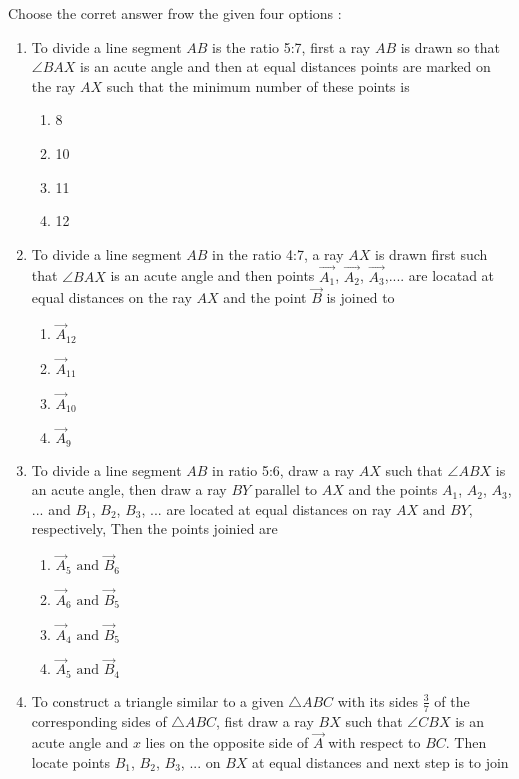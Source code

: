 Choose the corret answer frow the given four options :
\iffalse
\begin{enumerate}
\item To divide a line segment $AB$ is the ratio 5:7, first a ray $AB$ is drawn so that $\angle{BAX}$ is an acute angle and then at equal distances points are marked on the ray $AX$ such that the minimum number of these points is 
\begin{enumerate}
\item 8
\item 10
\item 11
\item 12
\end{enumerate}
\item To divide a line segment $AB$ in the ratio 4:7, a ray $AX$ is drawn first such that $\angle{BAX}$ is an acute angle and then points $\vec{A_1}$, $\vec{A_2}$, $\vec{A_3}$,.... are locatad at equal distances on the ray $AX$ and the point $\vec{B}$ is joined to 
\begin{enumerate}
	\item $\vec{A}_{12}$
	\item $\vec{A}_{11}$
	\item $\vec{A}_{10}$
	\item $\vec{A}_9$
\end{enumerate}
\item To divide a line segment $AB$ in ratio 5:6, draw a ray $AX$ such that $\angle{ABX}$ is an acute angle, then draw a ray $BY$ parallel to $AX$ and the points $A_1$, $A_2$, $A_3$, ... and $B_1$, $B_2$, $B_3$, ... are located at equal distances on ray $AX\text{ and }BY$, respectively, Then the points joinied are 
\begin{enumerate}
\item $\vec{A}_5\text{ and }\vec{B}_6$
\item $\vec{A}_6\text{ and }\vec{B}_5$
\item $\vec{A}_4\text{ and }\vec{B}_5$
\item $\vec{A}_5\text{ and }\vec{B}_4$
\end{enumerate}
\item To construct a triangle similar to a given $\triangle{ABC}$ with its sides $\frac{3}{7}$ of the corresponding sides of $\triangle{ABC}$, fist draw a ray $BX$ such that $\angle{CBX}$ is an acute angle and $x$ lies on 
the opposite side of $\vec{A}$ with respect to $BC$. Then locate points $B_1$, $B_2$, $B_3$, ... on $BX$ at equal distances and next step is to join
\begin{enumerate}

\end{enumerate}
\end{enumerate}
